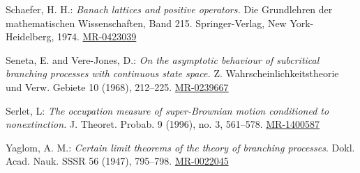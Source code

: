 \documentclass[12pt,a4paper]{amsart}
\numberwithin{equation}{section}
\theoremstyle{plain}
\theoremstyle{definition}
\theoremstyle{remark}
\def\MR#1{\href{http://www.ams.org/mathscinet-getitem?mr=#1}{MR-#1}}
\begin{document}
\begin{thebibliography}{99}
	Schaefer, H. H.:
	\emph{Banach lattices and positive operators.}
	Die Grundlehren der mathematischen Wissenschaften, Band 215. Springer-Verlag, New York-Heidelberg, 1974.
	\MR{0423039}
	
	Seneta, E. and Vere-Jones, D.:
	\emph{On the asymptotic behaviour of subcritical branching processes with continuous state space.}
	Z. Wahrscheinlichkeitstheorie und Verw. Gebiete 10 (1968),
	212--225.
	\MR{0239667}
	
	Serlet, L:
	\emph{The occupation measure of super-Brownian motion conditioned to nonextinction.}
	J. Theoret. Probab. 9 (1996), no. 3, 561--578.
	\MR{1400587}

	Yaglom, A. M.: \emph{Certain limit theorems of the theory of branching processes}. Dokl. Acad.
	Nauk. SSSR 56 (1947), 795--798.
	\MR{0022045}

\end{thebibliography}
\end{document}
